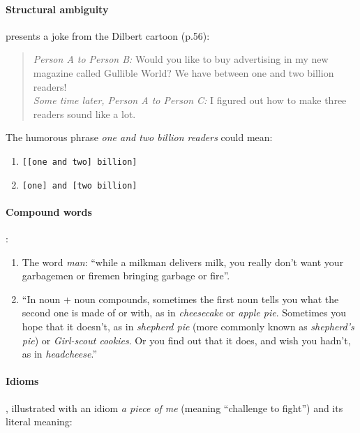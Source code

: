 \documentclass[11pt,a4paper]{article}
\begin{document}
\paragraph{Structural ambiguity} \citet{dubinsky2011understanding} presents a joke from the Dilbert cartoon (p.56): 

\begin{quote}
\textit{Person A to Person B:} Would you like to buy advertising in my new magazine called Gullible World? We have between one and two billion readers!\\[6pt]
\textit{Some time later, Person A to Person C:} I figured out how to make three readers sound like a lot.
\end{quote}

The humorous phrase \textit{one and two billion readers} could mean:
\begin{enumerate}
    \item \verb|[[one and two] billion]|
    \item \verb|[one] and [two billion]|
\end{enumerate}

\paragraph{Compound words} \citep[][p.44]{dubinsky2011understanding}: 

\begin{enumerate}
    \item The word \textit{man}: ``while a milkman delivers milk, you really don't want your garbagemen or firemen bringing garbage or fire''.

    \item ``In noun + noun compounds, sometimes the first noun tells you what the second one is made of or with, as in \textit{cheesecake} or \textit{apple pie}. Sometimes you hope that it doesn't, as in \textit{shepherd pie} (more commonly known as \textit{shepherd's pie}) or \textit{Girl-scout cookies}. Or you find out that it does, and wish you hadn't, as in \textit{headcheese}.'' 
\end{enumerate}


\paragraph{Idioms} \citep[][p.46]{dubinsky2011understanding}, illustrated with an idiom \textit{a piece of me} (meaning “challenge to fight”) and its literal meaning:
\end{document}
